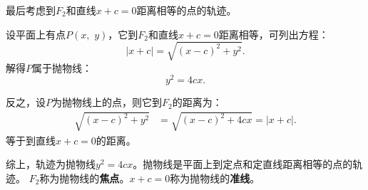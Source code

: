 \documentclass[12pt,UTF8,fontset=none]{ctexbook}
\begin{document}
最后考虑到$F_2$和直线$x + c = 0$距离相等的点的轨迹。

设平面上有点$P(x, \,\,y)$，它到$F_2$和直线$x + c = 0$距离相等，可列出方程：
$$ \left|x + c\right| = \sqrt{(x - c)^2 + y^2}.$$
解得$P$属于抛物线：
$$ y^2 = 4cx.$$

反之，设$P$为抛物线上的点，则它到$F_2$的距离为：
\begin{align*}
    \sqrt{(x - c)^2 + y^2} &= \sqrt{(x - c)^2 + 4cx} = |x + c|.
\end{align*}
等于到直线$x + c = 0$的距离。

综上，轨迹为抛物线$ y^2 = 4cx$。抛物线是平面上到定点和定直线距离相等的点的轨迹。
$F_2$称为抛物线的\textbf{焦点}。$x + c = 0$称为抛物线的\textbf{准线}。

\begin{figure}[h] 
    \centering
\end{figure}
\end{document}
